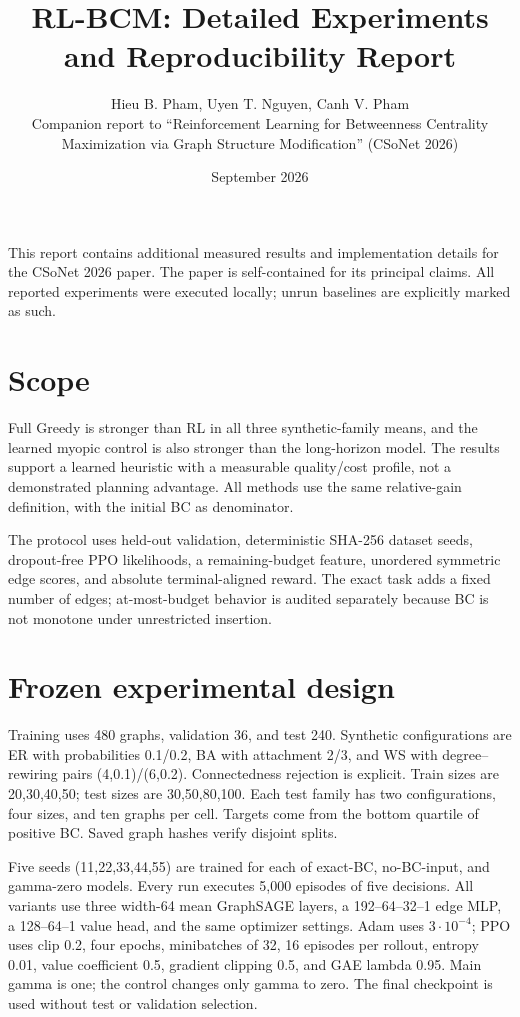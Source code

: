 \documentclass[11pt]{article}
\title{RL-BCM: Detailed Experiments and Reproducibility Report}
\author{Hieu B. Pham, Uyen T. Nguyen, Canh V. Pham\\[2pt]\small Companion report to ``Reinforcement Learning for Betweenness Centrality\\\small Maximization via Graph Structure Modification'' (CSoNet 2026)}
\date{September 2026}
\begin{document}
\maketitle
This report contains additional measured results and implementation details
for the CSoNet 2026 paper. The paper is self-contained for its principal
claims. All reported experiments were executed locally; unrun baselines are
explicitly marked as such.
\tableofcontents

\section{Scope}
Full Greedy is stronger
than RL in all three synthetic-family means, and the learned myopic control is
also stronger than the long-horizon model. The results support a learned
heuristic with a measurable quality/cost profile, not a demonstrated planning
advantage. All methods use the same relative-gain definition, with the
initial BC as denominator.

The protocol uses held-out validation, deterministic SHA-256 dataset
seeds, dropout-free PPO likelihoods, a remaining-budget feature,
unordered symmetric edge scores, and absolute terminal-aligned reward.
The exact task adds a fixed number of edges; at-most-budget behavior is audited
separately because BC is not monotone under unrestricted insertion.

\section{Frozen experimental design}
Training uses 480 graphs, validation 36, and test 240. Synthetic configurations
are ER with probabilities 0.1/0.2, BA with attachment 2/3, and WS with
degree--rewiring pairs (4,0.1)/(6,0.2). Connectedness rejection is explicit.
Train sizes are 20,30,40,50; test sizes are 30,50,80,100. Each test family has
two configurations, four sizes, and ten graphs per cell. Targets come from the
bottom quartile of positive BC. Saved graph hashes verify disjoint splits.

Five seeds (11,22,33,44,55) are trained for each of exact-BC, no-BC-input,
and gamma-zero models. Every run executes 5,000 episodes of five decisions.
All variants use three width-64 mean GraphSAGE layers, a 192--64--32--1 edge
MLP, a 128--64--1 value head, and the same optimizer settings. Adam uses
$3\cdot10^{-4}$; PPO uses clip 0.2, four epochs, minibatches of 32, 16 episodes
per rollout, entropy 0.01, value coefficient 0.5, gradient clipping 0.5, and
GAE lambda 0.95. Main gamma is one; the control changes only gamma to zero.
The final checkpoint is used without test or validation selection.
\end{document}
